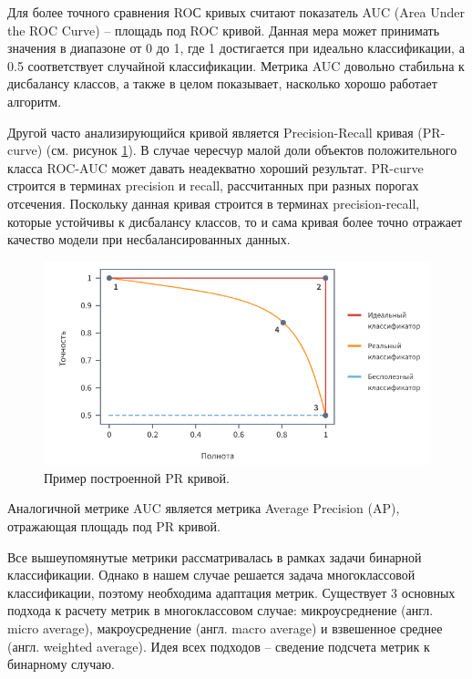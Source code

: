 \documentclass[a4paper,12pt]{extarticle}
\begin{document}
Для более точного сравнения ROС кривых считают показатель AUC (Area Under the ROC Curve) – площадь под ROC кривой. Данная мера может принимать значения в диапазоне от 0 до 1, где 1 достигается при идеально классификации, а 0.5 соответствует случайной классификации. Метрика AUC довольно стабильна к дисбалансу классов, а также в целом показывает, насколько хорошо работает алгоритм.

Другой часто анализирующийся кривой является Precision-Recall кривая (PR-curve) (см. рисунок \ref{fig:prcurve}). В случае чересчур малой доли объектов положительного класса ROC-AUC может давать неадекватно хороший результат. PR-curve строится в терминах precision и recall, рассчитанных при разных порогах отсечения. Поскольку данная кривая строится в терминах precision-recall, которые устойчивы к дисбалансу классов, то и сама кривая более точно отражает качество модели при несбалансированных данных.

\begin{figure}[ht]
	\centering
	\includegraphics[scale=0.8]{prcurve.png}
	\caption{Пример построенной PR кривой. \cite{https://loginom.ru/blog/classification-quality}}
	\label{fig:prcurve}
\end{figure}

Аналогичной метрике AUC является метрика Average Precision (AP), отражающая площадь под PR кривой.

Все вышеупомянутые метрики рассматривалась в рамках задачи бинарной классификации. Однако в нашем случае решается задача многоклассовой классификации, поэтому необходима адаптация метрик. Существует 3 основных подхода к расчету метрик в многоклассовом случае: микроусреднение (англ. micro average), макроусреднение (англ. macro average) и взвешенное среднее (англ. weighted average). Идея всех подходов – сведение подсчета метрик к бинарному случаю.
\end{document}
